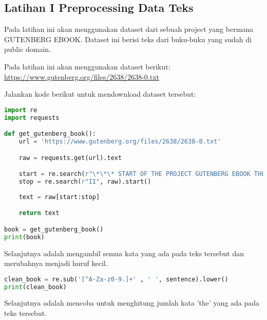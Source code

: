 \documentclass{article}
\begin{document}
    \subsection*{Latihan I Preprocessing Data Teks}

    \begin{flushleft}
        Pada latihan ini akan menggunakan dataset dari sebuah project yang bermana GUTENBERG EBOOK\@. 
        Dataset ini berisi teks dari buku-buku yang sudah di public domain.
        \newline

        Pada latihan ini akan menggunakan dataset berikut: \\
        \href{https://www.gutenberg.org/files/2638/2638-0.txt}{https://www.gutenberg.org/files/2638/2638-0.txt}
        \newline

        Jalankan kode berikut untuk mendownload dataset tersebut:
    \end{flushleft}

    \begin{lstlisting}[language=python, style=pythonstyle]
import re
import requests

def get_gutenberg_book():
    url = 'https://www.gutenberg.org/files/2638/2638-0.txt'

    raw = requests.get(url).text

    start = re.search(r"\*\*\* START OF THE PROJECT GUTENBERG EBOOK THE IDIOT \*\*\*", raw).end()
    stop = re.search(r"II", raw).start()
    
    text = raw[start:stop]

    return text

book = get_gutenberg_book()
print(book)
    \end{lstlisting}

    \begin{flushleft}
        Selanjutnya adalah mengambil semua kata yang ada pada teks tersebut dan merubahnya menjadi huruf kecil.
    \end{flushleft}

    \begin{lstlisting}[language=python, style=pythonstyle]
clean_book = re.sub('[^A-Za-z0-9.]+' , ' ', sentence).lower()
print(clean_book)
    \end{lstlisting}

    \begin{flushleft}
        Selanjutnya adalah mencoba untuk menghitung jumlah kata \@'the\@' yang ada pada teks tersebut.
    \end{flushleft}
\end{document}
